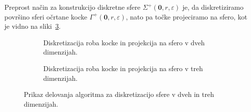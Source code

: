 Preprost način za konstrukcijo diskretne sfere $\Sigma^+(\textbf{0}, r, \varepsilon)$ je, da diskretiziramo površino sferi očrtane kocke $\Gamma^+(\textbf{0}, r, \varepsilon)$, nato pa točke projeciramo na sfero, kot je vidno na sliki~\ref{fig:constructing_sphere}.
\begin{figure}[ht]
    \begin{subfigure}{0.49\textwidth}
        \centering
        
        \caption{Diskretizacija roba kocke in projekcija na sfero v dveh dimenzijah.}
        \label{fig:constructing_sphere_1}
    \end{subfigure}
    \hfill
    \begin{subfigure}{0.49\textwidth}
        \centering
        
        \caption{Diskretizacija roba kocke in projekcija na sfero v treh dimenzijah.}
        \label{fig:constructing_sphere_2}
    \end{subfigure}
    \caption{Prikaz delovanja algoritma za diskretizacijo sfere v dveh in treh dimenzijah.}
    \label{fig:constructing_sphere}
\end{figure}

